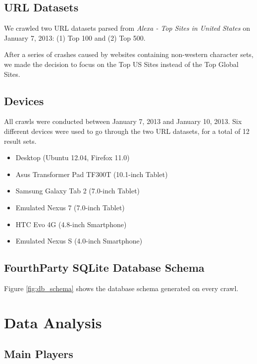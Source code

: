 \documentclass{acm_proc_article-sp}
\begin{document}
\subsection{URL Datasets}

We crawled two URL datasets parsed from \emph{Alexa - Top Sites in United States} on January 7, 2013: (1) Top 100 and (2) Top 500.

After a series of crashes caused by websites containing non-western character sets, we made the decision to focus on the Top US Sites instead of the Top Global Sites.

\subsection{Devices}

All crawls were conducted between January 7, 2013 and January 10, 2013. Six different devices were used to go through the two URL datasets, for a total of 12 result sets.

\begin{itemize}
\item Desktop (Ubuntu 12.04, Firefox 11.0)

\item Asus Transformer Pad TF300T (10.1-inch Tablet)

\item Samsung Galaxy Tab 2 (7.0-inch Tablet)

\item Emulated Nexus 7 (7.0-inch Tablet)

\item HTC Evo 4G (4.8-inch Smartphone)

\item Emulated Nexus S (4.0-inch Smartphone)
\end{itemize}

\subsection{FourthParty SQLite Database Schema}
Figure \ref{fig:db_schema} shows the database schema generated on every crawl.

\section{Data Analysis}

\subsection{Main Players}
\end{document}
